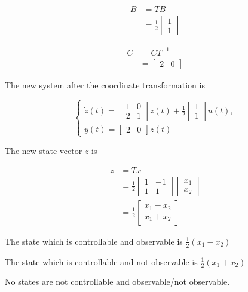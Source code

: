 \documentclass{article}
\begin{document}
\begin{align*}
    \bar B &= T B \\
    &= \frac{1}{2}
    \begin{bmatrix}
        1 \\
        1
    \end{bmatrix}
\end{align*}

\begin{align*}
    \bar C &= C T^{-1}  \\
    &=
    \begin{bmatrix}
        2 & 0
    \end{bmatrix}
\end{align*}

The new system after the coordinate transformation is

\[
\left\{
    \begin{array}{l}
        \dot z(t) = 
        \begin{bmatrix}
            1 & 0 \\
            2 & 1 
        \end{bmatrix}
        z(t) +  \frac{1}{2}
        \begin{bmatrix}
            1 \\
            1
        \end{bmatrix}
        u(t), \\
        y(t) = 
        \begin{bmatrix}
            2 & 0
        \end{bmatrix}
        z(t)
    \end{array}
\right.
\]

The new state vector $z$ is

\begin{align*}
    z & = T x \\
    &= \frac{1}{2}
    \begin{bmatrix}
        1 & -1 \\
        1 & 1
    \end{bmatrix}
    \begin{bmatrix}
        x_1 \\
        x_2
    \end{bmatrix} \\
    &= \frac{1}{2}
    \begin{bmatrix}
        x_1 - x_2 \\
        x_1 + x_2
    \end{bmatrix}
\end{align*}

The state which is controllable and observable is $\frac{1}{2}(x_1 - x_2)$

The state which is controllable and not observable is $\frac{1}{2}(x_1 + x_2)$

No states are not controllable and observable/not observable.
\end{document}
